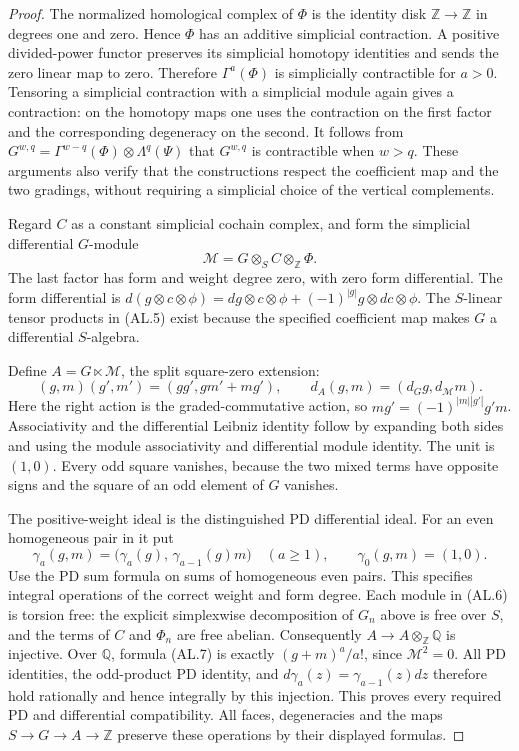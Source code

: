 \begin{proof}
The normalized homological complex of $\Phi$ is the identity
disk $\mathbb Z\to\mathbb Z$ in degrees one and zero.  Hence
$\Phi$ has an additive simplicial contraction.
A positive divided-power functor preserves its simplicial
homotopy identities and sends the zero linear map to zero.
Therefore $\Gamma^a(\Phi)$ is simplicially contractible for
$a>0$.  Tensoring a simplicial contraction with a simplicial
module again gives a contraction: on the homotopy maps one uses
the contraction on the first factor and the corresponding
degeneracy on the second.  It follows from
$G^{w,q}=\Gamma^{w-q}(\Phi)\otimes\Lambda^q(\Psi)$ that
$G^{w,q}$ is contractible when $w>q$.  These arguments also
verify that the constructions respect the coefficient map and
the two gradings, without requiring a simplicial choice of the
vertical complements.

Regard $C$ as a constant simplicial cochain complex, and form the
simplicial differential $G$-module
\[
 \mathcal M=G\otimes_S C\otimes_{\mathbb Z}\Phi.
 \tag{AL.5}
\]
The last factor has form and weight degree zero, with zero form
differential.  The form differential is
$d(g\otimes c\otimes\phi)=dg\otimes c\otimes\phi+
(-1)^{|g|}g\otimes dc\otimes\phi$.
The $S$-linear tensor products in \textup{(AL.5)} exist because
the specified coefficient map makes $G$ a differential
$S$-algebra.

Define $A=G\ltimes\mathcal M$, the split square-zero extension:
\[
 (g,m)(g',m')=(gg',gm'+mg'),\qquad
 d_A(g,m)=(d_Gg,d_{\mathcal M}m).
 \tag{AL.6}
\]
Here the right action is the graded-commutative action, so
$mg'=(-1)^{|m||g'|}g'm$.  Associativity and the differential
Leibniz identity follow by expanding both sides and using the
module associativity and differential module identity.
The unit is $(1,0)$.  Every odd square vanishes, because the two
mixed terms have opposite signs and the square of an odd
element of $G$ vanishes.

The positive-weight ideal is the distinguished PD differential
ideal.  For an even homogeneous pair in it put
\[
 \gamma_a(g,m)=
 \bigl(\gamma_a(g),\,\gamma_{a-1}(g)m\bigr)\quad(a\geq1),
 \qquad \gamma_0(g,m)=(1,0).
 \tag{AL.7}
\]
Use the PD sum formula on sums of homogeneous even pairs.
This specifies integral operations of the correct weight and
form degree.  Each module in \textup{(AL.6)} is torsion free:
the explicit simplexwise decomposition of $G_n$ above is free
over $S$, and the terms of $C$ and $\Phi_n$ are free abelian.
Consequently $A\to A\otimes_{\mathbb Z}\mathbb Q$ is injective.
Over $\mathbb Q$, formula \textup{(AL.7)} is exactly
$(g+m)^a/a!$, since $\mathcal M^2=0$.  All PD identities,
the odd-product PD identity, and
$d\gamma_a(z)=\gamma_{a-1}(z)dz$ therefore hold rationally
and hence integrally by this injection.  This proves every
required PD and differential compatibility.  All faces,
degeneracies and the maps $S\to G\to A\to\mathbb Z$ preserve
these operations by their displayed formulas.


\end{proof}
